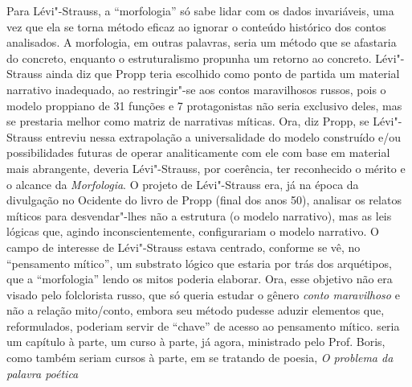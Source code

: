 {  Para Lévi"-Strauss, a ``morfologia'' só sabe lidar com os dados
  invariáveis, uma vez que ela se torna método eficaz ao ignorar o
  conteúdo histórico dos contos analisados. A morfologia, em outras
  palavras, seria um método que se afastaria do concreto, enquanto o
  estruturalismo propunha
  um retorno ao concreto. Lévi"-Strauss ainda diz que Propp teria
  escolhido como ponto de partida um material narrativo inadequado, ao
  restringir"-se aos contos maravilhosos russos, pois o modelo proppiano
  de 31 funções e 7 protagonistas não seria exclusivo deles, mas se
  prestaria melhor como matriz de narrativas míticas. Ora, diz Propp,
  se Lévi"-Strauss entreviu nessa extrapolação a universalidade do modelo
  construído e/ou possibilidades futuras de operar analiticamente com
  ele com base em material mais abrangente, deveria Lévi"-Strauss, por
  coerência, ter reconhecido o mérito e o alcance da \emph{Morfologia}.
  O projeto de Lévi"-Strauss era, já na época da divulgação no Ocidente
  do livro de Propp (final dos anos 50), analisar os relatos míticos
  para desvendar"-lhes não a estrutura (o modelo narrativo), mas as leis
  lógicas que, agindo inconscientemente, configurariam o modelo
  narrativo. O campo de interesse de Lévi"-Strauss estava
  centrado, conforme se vê, no ``pensamento mítico'', um substrato
  lógico que estaria por trás dos arquétipos, que a ``morfologia'' lendo
  os mitos poderia elaborar. Ora, esse objetivo não era visado pelo
  folclorista russo, que só queria estudar o gênero \emph{conto
  maravilhoso} e não a relação mito/conto, embora seu método pudesse
  aduzir elementos que, reformulados, poderiam servir de ``chave'' de
  acesso ao pensamento mítico.} seria um capítulo à parte, um curso à
parte, já agora, ministrado pelo Prof. Boris, como também seriam cursos
à parte, em se tratando de poesia, \emph{O problema da palavra poética}
